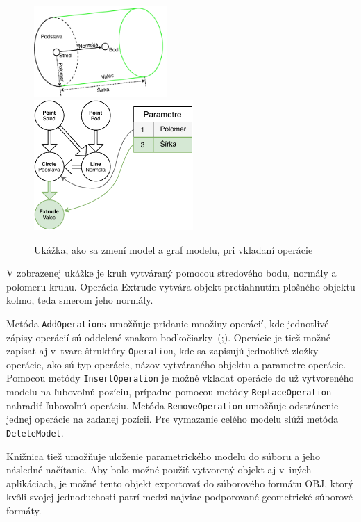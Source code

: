 \begin{figure}[H]
	\centering
	\includegraphics[align=c,width=0.45\textwidth]{obrazky-figures/Examples/DP Navrh operacii-Page-AddOperation model.pdf}
	\includegraphics[align=c,width=0.54\textwidth]{obrazky-figures/Examples/DP Navrh operacii-Page-AddOperation Graph.pdf}
	\caption{Ukážka, ako sa zmení model a graf modelu, pri vkladaní operácie}
	\label{fig:addOperation}
\end{figure}

V zobrazenej ukážke je kruh vytváraný pomocou stredového bodu, normály a polomeru kruhu. Operácia Extrude vytvára objekt pretiahnutím plošného objektu kolmo, teda smerom jeho normály.

Metóda \texttt{AddOperations} umožňuje pridanie množiny operácií, kde jednotlivé zápisy operácií sú oddelené znakom bodkočiarky~(;).  Operácie je tiež možné zapísať aj v~tvare štruktúry \texttt{Operation}, kde sa zapisujú jednotlivé zložky operácie, ako sú typ operácie, názov vytváraného objektu a parametre operácie.
Pomocou metódy \texttt{InsertOperation} je možné vkladať operácie do už vytvoreného modelu na ľubovoľnú pozíciu, prípadne pomocou metódy \texttt{ReplaceOperation} nahradiť ľubovoľnú operáciu. 
Metóda \texttt{RemoveOperation} umožňuje odstránenie jednej operácie na zadanej pozícii. Pre vymazanie celého modelu slúži metóda \texttt{DeleteModel}. 


Knižnica tiež umožňuje uloženie parametrického modelu do  súboru a jeho následné načítanie. Aby bolo možné použiť vytvorený objekt aj v~iných aplikáciach, je možné tento objekt exportovať do súborového formátu OBJ, ktorý kvôli svojej jednoduchosti patrí medzi najviac podporované geometrické súborové formáty. 

